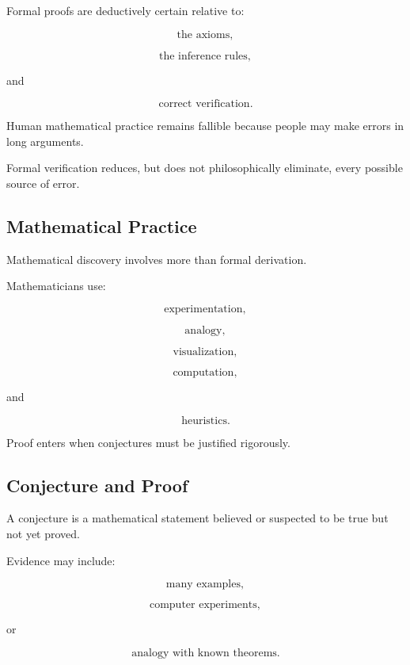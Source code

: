 Formal proofs are deductively certain relative to:

\[
\boxed{
\text{the axioms},
}
\]

\[
\boxed{
\text{the inference rules},
}
\]

and

\[
\boxed{
\text{correct verification}.
}
\]

Human mathematical practice remains fallible because people may make errors
in long arguments.

Formal verification reduces, but does not philosophically eliminate, every
possible source of error.

\subsection{Mathematical Practice}
\label{subsec:philosophy-mathematical-practice}

Mathematical discovery involves more than formal derivation.

Mathematicians use:

\[
\boxed{
\text{experimentation},
}
\]

\[
\boxed{
\text{analogy},
}
\]

\[
\boxed{
\text{visualization},
}
\]

\[
\boxed{
\text{computation},
}
\]

and

\[
\boxed{
\text{heuristics}.
}
\]

Proof enters when conjectures must be justified rigorously.

\subsection{Conjecture and Proof}
\label{subsec:conjecture-and-proof}

A conjecture is a mathematical statement believed or suspected to be true
but not yet proved.

Evidence may include:

\[
\boxed{
\text{many examples},
}
\]

\[
\boxed{
\text{computer experiments},
}
\]

or

\[
\boxed{
\text{analogy with known theorems}.
}
\]

